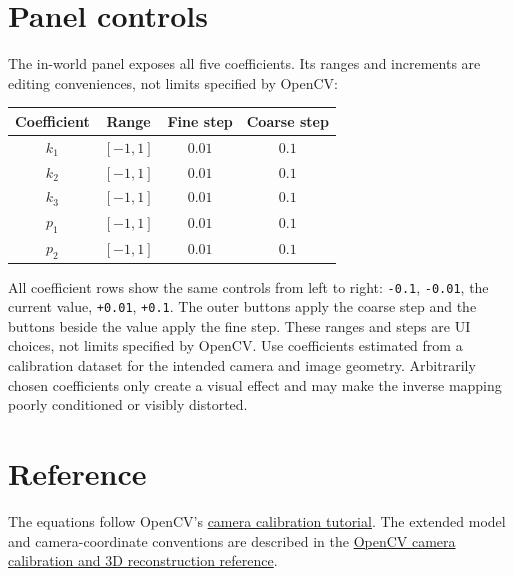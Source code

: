 \documentclass[11pt,a4paper]{article}
\begin{document}
\section{Panel controls}
The in-world panel exposes all five coefficients. Its ranges and increments
are editing conveniences, not limits specified by OpenCV:
\begin{center}
\begin{tabular}{c|c|c|c}
Coefficient & Range & Fine step & Coarse step\\
\hline
$k_1$ & $[-1,1]$ & $0.01$ & $0.1$\\
$k_2$ & $[-1,1]$ & $0.01$ & $0.1$\\
$k_3$ & $[-1,1]$ & $0.01$ & $0.1$\\
$p_1$ & $[-1,1]$ & $0.01$ & $0.1$\\
$p_2$ & $[-1,1]$ & $0.01$ & $0.1$
\end{tabular}
\end{center}
All coefficient rows show the same controls from left to right:
\texttt{-0.1}, \texttt{-0.01}, the current value,
\texttt{+0.01}, \texttt{+0.1}. The outer buttons apply the coarse step and the
buttons beside the value apply the fine step. These ranges and steps are UI
choices, not limits specified by OpenCV. Use coefficients estimated from a
calibration dataset for the intended camera and image geometry. Arbitrarily
chosen coefficients only create a visual effect and may make the inverse
mapping poorly conditioned or visibly distorted.

\section{Reference}
The equations follow OpenCV's
\href{https://github.com/opencv/opencv/blob/4.x/doc/py_tutorials/py_calib3d/py_calibration/py_calibration.markdown}
{camera calibration tutorial}.
The extended model and camera-coordinate conventions are described in the
\href{https://docs.opencv.org/4.x/d9/d0c/group__calib3d.html}
{OpenCV camera calibration and 3D reconstruction reference}.
\end{document}
